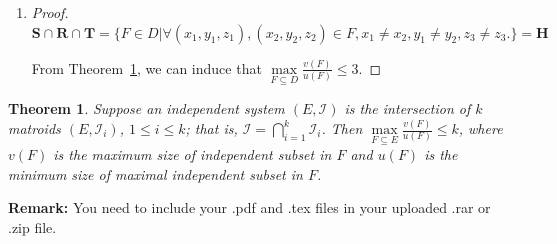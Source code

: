 \documentclass[12pt,a4paper]{article}
\makeatletter
\newtheorem{theorem}{Theorem}
\newtheorem*{solution}{Solution}
\theoremstyle{definition}
\renewenvironment{solution}[1][Solution] {\par\pushQED{\qed}\normalfont\topsep6\p@\@plus6\p@\relax\trivlist\item[\hskip\labelsep\bfseries#1\@addpunct{.}]\ignorespaces}{\popQED\endtrivlist\@endpefalse} \makeatother
\makeatother
\begin{document}
\begin{enumerate}
\begin{enumerate}
\begin{solution}
\begin{proof}
$\mathbf{S}\cap \mathbf{R} \cap \mathbf{T} = \{F\in D| \forall (x_1,y_1,z_1), (x_2,y_2,z_2) \in F, x_1\neq x_2, y_1\neq y_2, z_3\neq z_3.\} = \mathbf{H}$

From Theorem~\ref{Thm-Intersect}, we can induce that $\max\limits_{F \subseteq D} \frac{v(F)}{u(F)} \leq 3$.
	\end{proof}
			    
    	    \end{solution}
    \end{enumerate}
    \begin{theorem} \label{Thm-Intersect}
        Suppose an independent system $(E, \mathcal{I})$ is the intersection of $k$ matroids $\left(E, \mathcal{I}_{i}\right)$, $1 \leq i \leq k$; that is, $\mathcal{I}=\bigcap_{i=1}^{k} \mathcal{I}_{i}$. Then $\max\limits_{F \subseteq E} \frac{v(F)}{u(F)} \leq k$, where $v(F)$ is the maximum size of independent subset in $F$ and $u(F)$ is the minimum size of maximal independent subset in $F$.
    \end{theorem}    
\end{enumerate}

\vspace{20pt}

\textbf{Remark:} You need to include your .pdf and .tex files in your uploaded .rar or .zip file.

\end{document}
